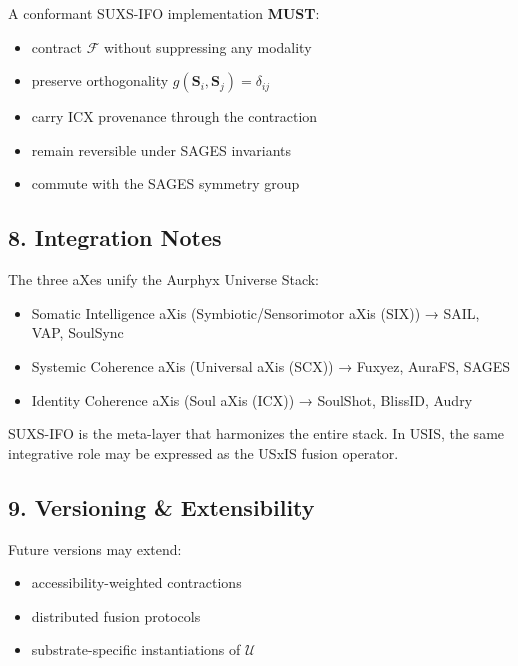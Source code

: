 A conformant SUXS-IFO implementation \textbf{MUST}:

\begin{itemize}
\tightlist
\item
  contract \(\mathcal{F}\) without suppressing any modality
\item
  preserve orthogonality \(g(\mathbf{S}_i,\mathbf{S}_j)=\delta_{ij}\)
\item
  carry ICX provenance through the contraction
\item
  remain reversible under SAGES invariants
\item
  commute with the SAGES symmetry group
\end{itemize}

\subsection{8. Integration Notes}\label{integration-notes}

The three aXes unify the Aurphyx Universe Stack:

\begin{itemize}
\tightlist
\item
  Somatic Intelligence aXis (Symbiotic/Sensorimotor aXis (SIX)) → SAIL, VAP, SoulSync
\item
  Systemic Coherence aXis (Universal aXis (SCX)) → Fuxyez, AuraFS, SAGES
\item
  Identity Coherence aXis (Soul aXis (ICX)) → SoulShot, BlissID, Audry
\end{itemize}

SUXS-IFO is the meta-layer that harmonizes the entire stack. In USIS, the same integrative role may be expressed as the USxIS fusion operator.

\subsection{9. Versioning \& Extensibility}\label{versioning-extensibility}

Future versions may extend:

\begin{itemize}
\tightlist
\item
  accessibility-weighted contractions
\item
  distributed fusion protocols
\item
  substrate-specific instantiations of \(\mathcal{U}\)
\end{itemize}
